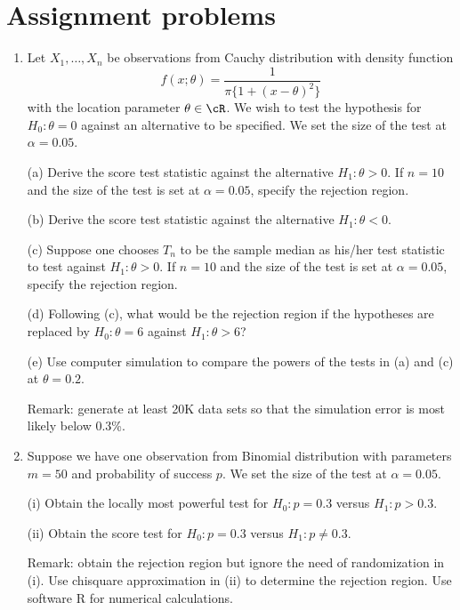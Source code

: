 \section{Assignment problems}
\begin{enumerate}
\item
Let $X_1, \ldots, X_n$ be \iid observations from Cauchy distribution
with density function
\[
f(x; \theta) = \frac{1}{\pi \{ 1 + (x - \theta)^2\}}
\]
with the location parameter $\theta \in \cR$.
We wish to test the hypothesis for $H_0: \theta = 0$ against an alternative
to be specified. We set the size of the test at $\alpha = 0.05$.

(a) Derive the score test statistic against the alternative $H_1: \theta > 0$.
  If $n=10$ and the size of the test is set at $\alpha = 0.05$, specify the rejection region.

(b) Derive the score test statistic against the alternative $H_1: \theta < 0$.

(c) Suppose one chooses $T_n$ to be the sample median as his/her test statistic
to test against $H_1: \theta > 0$.
  If $n=10$ and the size of the test is set at $\alpha = 0.05$, specify the rejection region.
  
(d) Following (c), what would be the rejection region if the
hypotheses are replaced by $H_0: \theta = 6$ against $H_1: \theta > 6$?
  
(e) Use computer simulation to compare the powers of the tests in (a) and (c)
at $\theta = 0.2$. 

Remark: generate at least 20K data sets so that the simulation error is
most likely below 0.3\%.

\item
Suppose we have one observation from Binomial distribution
with parameters $m = 50$ and probability of success $p$.
 We set the size of the test at $\alpha = 0.05$.

(i) Obtain the locally most powerful test
for $H_0: p = 0.3$ versus $H_1: p > 0.3$.

(ii) Obtain the score test
for $H_0: p = 0.3$ versus $H_1: p \neq 0.3$.

Remark: obtain the rejection region but ignore the need of randomization in (i).
Use chisquare approximation in (ii) to determine the rejection region.
Use software R for numerical calculations.
\end{enumerate}
